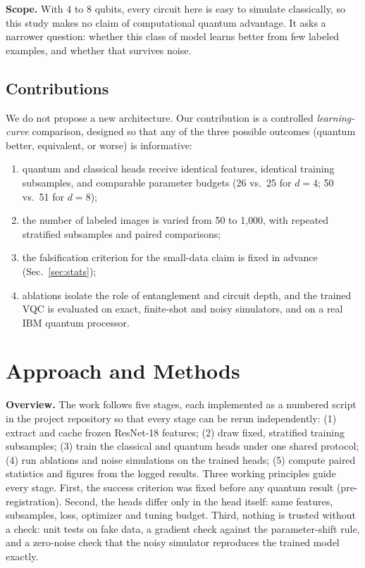 \documentclass[conference]{IEEEtran}
\begin{document}
\textbf{Scope.} With 4 to 8 qubits, every circuit here is easy to simulate
classically, so this study makes no claim of computational quantum
advantage. It asks a narrower question: whether this class of model
learns better from few labeled examples, and whether that survives noise.

\subsection{Contributions}

We do not propose a new architecture. Our
contribution is a controlled \emph{learning-curve} comparison, designed so
that any of the three possible outcomes (quantum better, equivalent, or
worse) is informative:
\begin{enumerate}
\item quantum and classical heads receive identical features, identical
training subsamples, and comparable parameter budgets (26 vs.\ 25 for
$d=4$; 50 vs.\ 51 for $d=8$);
\item the number of labeled images is varied from 50 to 1{,}000, with
repeated stratified subsamples and paired comparisons;
\item the falsification criterion for the small-data claim is fixed in
advance (Sec.~\ref{sec:stats});
\item ablations isolate the role of entanglement and circuit depth, and the
trained VQC is evaluated on exact, finite-shot and noisy simulators, and
on a real IBM quantum processor.
\end{enumerate}

\section{Approach and Methods}
\label{sec:approach}
\textbf{Overview.} The work follows five stages, each implemented as a
numbered script in the project repository so that every stage can be
rerun independently: (1) extract and cache frozen ResNet-18 features;
(2) draw fixed, stratified training subsamples; (3) train the classical and
quantum heads under one shared protocol; (4) run ablations and noise
simulations on the trained heads; (5) compute paired statistics and
figures from the logged results. Three working principles guide every
stage. First, the success criterion was fixed before any quantum result
(pre-registration). Second, the heads differ only in the head itself:
same features, subsamples, loss, optimizer and tuning budget. Third,
nothing is trusted without a check: unit tests on fake data, a gradient
check against the parameter-shift rule, and a zero-noise check that the
noisy simulator reproduces the trained model exactly.
\end{document}
